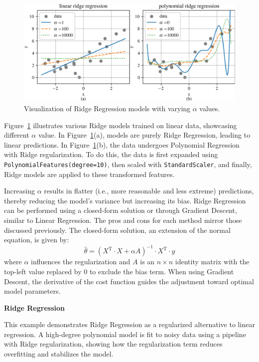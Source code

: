 \documentclass[12pt,letter]{article}
\begin{document}
\begin{figure}[H]
    \centering
    \includegraphics[width=6.5in]{../figures/ridge_regression.png}
    \caption{Visualization of Ridge Regression models with varying $\alpha$ values.}
    \label{fig:ridge_regression}
\end{figure}

Figure~\ref{fig:ridge_regression} illustrates various Ridge models trained on linear data, showcasing different $\alpha$ value. In Figure~\ref{fig:ridge_regression}(a), models are purely Ridge Regression, leading to linear predictions. In Figure~\ref{fig:ridge_regression}(b), the data undergoes Polynomial Regression with Ridge regularization. To do this, the data is first expanded using \texttt{PolynomialFeatures(degree=10)}, then scaled with \texttt{StandardScaler}, and finally, Ridge models are applied to these transformed features.


Increasing $\alpha$ results in flatter (i.e., more reasonable and less extreme) predictions, thereby reducing the model's variance but increasing its bias. Ridge Regression can be performed using a closed-form solution or through Gradient Descent, similar to Linear Regression. The pros and cons for each method mirror those discussed previously. The closed-form solution, an extension of the normal equation, is given by:
\begin{equation}
\hat{\theta} = (X^\text{T} \cdot X + \alpha A)^{-1} \cdot X^\text{T} \cdot y
\end{equation}
where $\alpha$ influences the regularization and $A$ is an $n \times n$ identity matrix with the top-left value replaced by 0 to exclude the bias term. When using Gradient Descent, the derivative of the cost function guides the adjustment toward optimal model parameters.

\begin{example}
\textbf{Ridge Regression}

\noindent This example demonstrates Ridge Regression as a regularized alternative to linear regression. A high-degree polynomial model is fit to noisy data using a pipeline with Ridge regularization, showing how the regularization term reduces overfitting and stabilizes the model.
\end{example}
\end{document}
